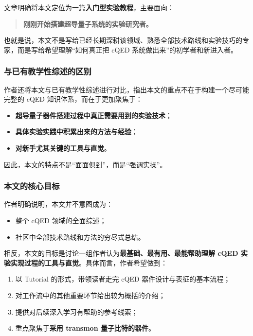 \documentclass[12pt,a4paper,oneside]{ctexbook}
\begin{document}
文章明确将本文定位为一篇\textbf{入门型实验教程}，主要面向：
\begin{quote}
\textbf{刚刚开始搭建超导量子系统的实验研究者。}
\end{quote}

也就是说，本文不是写给已经长期深耕该领域、熟悉全部技术路线和实验技巧的专家，而是写给希望理解“如何真正把 cQED 系统做出来”的初学者和新进入者。

\subsubsection{与已有教学性综述的区别}

作者还将本文与已有教学性综述进行对比，指出本文的重点不在于构建一个尽可能完整的 cQED 知识体系，而在于更加聚焦于：
\begin{itemize}[leftmargin=2em]
    \item \textbf{超导量子器件搭建过程中真正需要用到的实验技术}；
    \item \textbf{具体实验实践中积累出来的方法与经验}；
    \item \textbf{对新手尤其关键的工具与直觉}。
\end{itemize}

因此，本文的特点不是“面面俱到”，而是“强调实操”。

\subsubsection{本文的核心目标}

作者明确说明，本文并不意图成为：
\begin{itemize}[leftmargin=2em]
    \item 整个 cQED 领域的全面综述；
    \item 社区中全部技术路线和方法的穷尽式总结。
\end{itemize}

相反，本文的目标是讨论一组作者认为\textbf{最基础、最有用、最能帮助理解 cQED 实验实现过程的工具与直觉}。具体而言，作者希望做到：
\begin{enumerate}[leftmargin=2em]
    \item 以 Tutorial 的形式，带领读者走完 cQED 器件设计与表征的基本流程；
    \item 对工作流中的其他重要环节给出较为概括的介绍；
    \item 提供对后续深入学习有帮助的参考线索；
    \item 重点聚焦于\textbf{采用 transmon 量子比特的器件}。
\end{enumerate}
\end{document}
